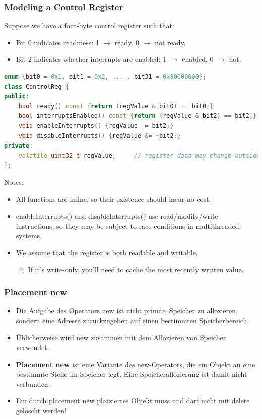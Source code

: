 \subsubsection{Modeling a Control Register}
Suppose we have a fout-byte control register such that:
\begin{itemize}
  \item Bit 0 indicates readiness: 1 $\rightarrow$ ready, 0 $\rightarrow$ not ready.
  \item Bit 2 indicates whether interrupts are enabled: 1 $\rightarrow$ enabled, 0 $\rightarrow$ not.
\end{itemize}
\begin{lstlisting}[language=C++]
enum {bit0 = 0x1, bit1 = 0x2, ... , bit31 = 0x80000000};
class ControlReg {
public:
	bool ready() const {return (regValue & bit0) == bit0;}
	bool interruptsEnabled() const {return (regValue & bit2) == bit2;}
	void enableInterrupts() {regValue |= bit2;}
	void disableInterrupts() {regValue &= ~bit2;}
private:
	volatile uint32_t regValue;		// register data may change outside program control
};
\end{lstlisting}

Notes:
\begin{itemize}
  \item All functions are inline, so their existence should incur no cost.
  \item enableInterrupts() and disableInterrupts() use read/modify/write instructions, so they may be subject to race conditions in multithreaded systems.
  \item We assume that the register is both readable and writable.
  \begin{itemize}
    \item If it's write-only, you'll need to cache the most recently written value.
  \end{itemize}
\end{itemize}

\subsubsection{Placement new}
\begin{itemize}
  \item Die Aufgabe des Operators new ist nicht primär, Speicher zu allozieren, sondern eine Adresse zurückzugeben auf einen bestimmten Speicherbereich.
  \item Üblicherweise wird new zusammen mit dem Allozieren von Speicher verwendet.
  \item \textbf{Placement new} ist eine Variante des new-Operators, die ein Objekt an eine bestimmte Stelle im Speicher legt. Eine Speicherallozierung ist damit nicht verbunden.
  \item Ein durch placement new platziertes Objekt muss und darf nicht mit delete gelöscht werden!
\end{itemize}

